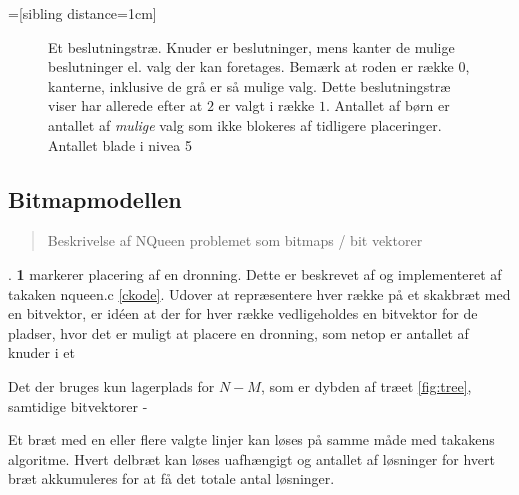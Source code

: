 \documentclass[final,a4paper,10pt]{article}
\begin{document}
=[sibling distance=1cm]
\begin{figure}[!h]

\caption{Et beslutningstræ. Knuder er beslutninger, mens kanter de mulige beslutninger el. valg der kan foretages.  Bemærk at roden er række 0, kanterne, inklusive de grå er så mulige valg. Dette beslutningstræ viser har allerede efter at $2$ er valgt i række $1$.
Antallet af børn er antallet af \textit{mulige} valg som ikke blokeres af tidligere placeringer. Antallet blade i nivea 5}
\label{tree}
\end{figure}


\subsection{Bitmapmodellen}\label{bitmapmodellen}
\begin{verse}
	Beskrivelse af NQueen problemet som bitmaps / bit vektorer
\end{verse}


. \textbf{1} markerer placering af en dronning. Dette er beskrevet af \cite{Zongyan02} og implementeret af takaken nqueen.c \ref{ckode}. Udover at repræsentere hver række på et skakbræt med en bitvektor, er idéen at der for hver række vedligeholdes en bitvektor for de pladser, hvor det er muligt at placere en dronning, som netop er antallet af knuder i et 



Det der bruges kun lagerplads for $N-M$,  som er dybden af træet \ref{fig:tree}, samtidige bitvektorer -

Et bræt med en eller flere valgte linjer kan løses på samme måde med takakens algoritme. Hvert delbræt kan løses uafhængigt og antallet af løsninger for hvert bræt akkumuleres for at få det totale antal løsninger.
\end{document}
